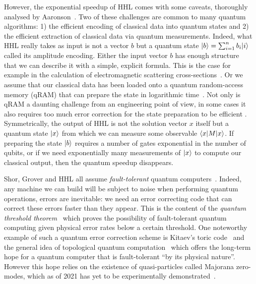 However, the exponential speedup of HHL comes with some caveats, thoroughly analysed by Aaronson~\cite{Aaronson15}.
Two of these challenges are common to many quantum algorithms:
1) the efficient encoding of classical data into quantum states and
2) the efficient extraction of classical data via quantum measurements.
Indeed, what HHL really takes as input is not a vector ${b}$ but a quantum state $|b\rangle = \sum_{i=1}^n b_i |i\rangle$ called its amplitude encoding.
Either the input vector ${b}$ has enough structure that we can describe it with a simple, explicit formula.
This is the case for example in the calculation of electromagnetic scattering cross-sections~\cite{CladerEtAl13}.
Or we assume that our classical data has been loaded onto a quantum random-access memory (qRAM) that can prepare the state in logarithmic time~\cite{GiovannettiEtAl08}.
Not only is qRAM a daunting challenge from an engineering point of view, in some cases it also requires too much error correction for the state preparation to be efficient \cite{ArunachalamEtAl15}.
Symmetrically, the output of HHL is not the solution vector ${x}$ itself but a quantum state $|x\rangle$ from which we can measure some observable $\langle x| M |x\rangle$.
If preparing the state $|b\rangle$ requires a number of gates exponential in the number of qubits, or if we need exponentially many measurements of $|x\rangle$ to compute our classical output, then the quantum speedup disappears.

Shor, Grover and HHL all assume \emph{fault-tolerant} quantum computers~\cite{Shor96}.
Indeed, any machine we can build will be subject to noise when performing quantum operations, errors are inevitable: we need an error correcting code that can correct these errors faster than they appear.
This is the content of the \emph{quantum threshold theorem}~\cite{AharonovBen-Or08} which proves the possibility of fault-tolerant quantum computing given physical error rates below a certain threshold.
One noteworthy example of such a quantum error correction scheme is Kitaev's toric code~\cite{Kitaev03} and the general idea of topological quantum computation~\cite{FreedmanEtAl03} which offers the long-term hope for a quantum computer that is fault-tolerant ``by its physical nature''.
However this hope relies on the existence of quasi-particles called Majorana zero-modes, which as of 2021 has yet to be experimentally demonstrated~\cite{Ball21}.

